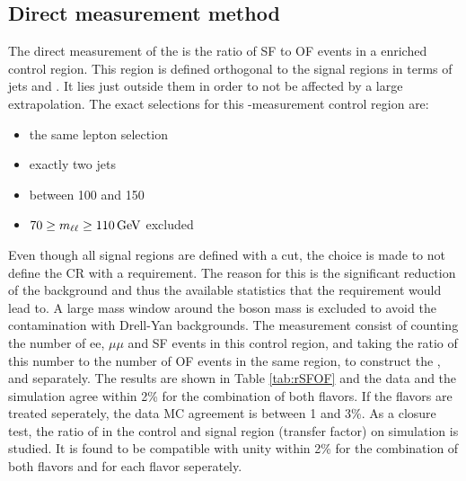 \subsection*{Direct measurement method}\label{sec:rsfofDirect}
\noindent
\justify
The direct measurement of the \Rsfof is the ratio of SF to OF events in a \ttbar enriched control region. 
This region is defined orthogonal to the signal regions in terms of jets and \ptmiss. 
It lies just outside them in order to not be affected by a large extrapolation. 
The exact selections for this \Rsfof-measurement control region are:
\begin{itemize}
    \item the same lepton selection
    \item exactly two jets
    \item \ptmiss between 100 and 150\GeV
    \item $70\geq m_{\ell\ell}\geq110\,\text{Ge\hspace{-.08em}V}$ excluded
\end{itemize}                                 
Even though all signal regions are defined with a \mttwo cut, the choice is made to not define the \ttbar CR with a \mttwo requirement. 
The reason for this is the significant reduction of the \ttbar background and thus the available statistics that the \mttwo requirement would lead to.
A large mass window around the \PZ boson mass is excluded to avoid the contamination with Drell-Yan backgrounds. 
The measurement consist of counting the number of ee, $\mu\mu$ and SF events in this control region, and taking the ratio of this number to the number of OF events in the same region, to construct the \Reeof, \Rmmof and \Rsfof separately. 
The results are shown in Table \ref{tab:rSFOF} and the data and the simulation agree within 2\% for the combination of both flavors. 
If the flavors are treated seperately, the data MC agreement is between 1 and 3\%. 
As a closure test, the ratio of \Rsfof in the control and signal region (transfer factor) on simulation is studied. 
It is found to be compatible with unity within 2\%  for the combination of both flavors and for each flavor seperately.
